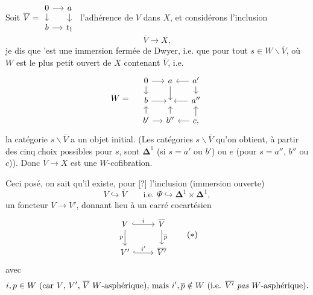 Soit $\overline{V} = \vcenter{\hbox{\begin{tikzcd}[row sep=small, column sep=small]
0 \arrow[r] \arrow[d] & a \arrow[d] \\
b \arrow[r] & t_1
\end{tikzcd}}}$ l'adhérence de $V$ dans $X$,
et considérons l'inclusion
\[ \overline{V} \longrightarrow X, \]
je dis que 'est une immersion fermée de Dwyer, i.e. que pour tout $s \in W\backslash\overline{V}$, où $W$ est le plus petit ouvert de $X$ contenant $\overline{V}$, i.e.
\[
W = \quad
\begin{tikzcd}[row sep=small, column sep=small]
0 \arrow[r] \arrow[d] & a \arrow[d] & a' \arrow[l] \arrow[d] \\
b \arrow[r] & {} & a'' \arrow[l] \\
b' \arrow[u] \arrow[r] & b'' \arrow[u] & c, \arrow[l] \arrow[u]
\end{tikzcd}
\]
la catégorie $s\backslash\overline{V}$ a un objet initial. (Les catégories $s\backslash\overline{V}$ qu'on obtient, à partir des cinq choix possibles pour $s$, sont $\boldsymbol{\Delta}^1$ (si $s = a'$ ou $b'$) ou $e$ (pour $s = a''$, $b''$ ou $c$)). Donc $\overline{V} \longrightarrow X$ est une $W$-cofibration.

Ceci posé, on sait qu'il existe, pour [?] l'inclusion (immersion ouverte)
\[ V \hookrightarrow \overline{V} \qquad \text{i.e. } \Psi \hookrightarrow \boldsymbol{\Delta}^1 \times \boldsymbol{\Delta}^1, \]
un foncteur $V \longrightarrow V'$, donnant lieu à un carré cocartésien
\[
\begin{tikzcd}
V \arrow[r, hook, "i"] \arrow[d, "p"'] & \overline{V} \arrow[d, "\overline{p}"] \\
V' \arrow[r, hook, "i'"] & \overline{V'}
\end{tikzcd}
\tag*{$(*)$}
\]
avec
\[ i, p \in W \ \text{(car $V$, $V'$, $\overline{V}$ $W$-asphérique), mais } i', \overline{p} \notin W \ \text{(i.e. $\overline{V'}$ \textit{pas} $W$-asphérique).} \]

